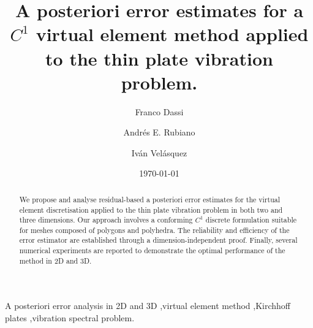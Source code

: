 \documentclass[final,reqno]{elsarticle}
\date{\today}
\begin{document}
\begin{frontmatter}

\title{A posteriori error estimates for a $C^1$ virtual element method applied to the thin plate vibration problem.}


\author[1]{Franco Dassi}
\address[1]{Dipartimento di Matematica e Applicazioni, Università degli studi di Milano Bicocca, Via Roberto Cozzi 55 - 20125 Milano, Italy.}
\author[2]{Andr\'es E. Rubiano}
\address[2]{School of Mathematics, Monash University, 9 Rainforest Walk, Melbourne, VIC 3800, Australia.}
\author[3]{Iv\'an Vel\'asquez}
\address[3]{Departamento de Matem\'aticas, Universidad Militar Nueva Granada, Bogot\'a, Colombia.}


\begin{abstract} 
We propose and analyse residual-based a posteriori error estimates for the virtual element discretisation applied to the thin plate vibration problem in both two and three dimensions.  Our approach involves a conforming $C^1$ discrete formulation suitable for meshes composed of polygons and polyhedra. The reliability and efficiency of the error estimator are established through a dimension-independent proof. Finally, several numerical experiments are reported to demonstrate the optimal performance of the method in 2D and 3D.


\end{abstract}

\begin{keyword} 
A posteriori error analysis in 2D and 3D 
\sep virtual element method
\sep Kirchhoff plates
\sep vibration spectral problem.
\end{keyword}


\end{frontmatter}

\setcounter{equation}{0}
\end{document}
